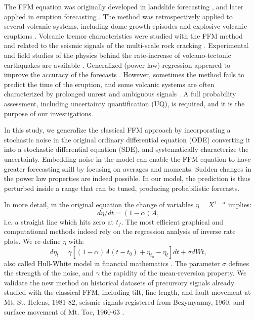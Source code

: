 \documentclass{article}
\begin{document}
The FFM equation was originally developed in landslide forecasting \citep{Voight1987, Voight1988b, Voight1989b}, and later applied in eruption forecasting \citep{Voight1988, Voight1989, Cornelius1995}. The method was retrospectively applied to several volcanic systems, including dome growth episodes and explosive volcanic eruptions \citep{Voight1991, Cornelius1994, Cornelius1996, Voight2000}. Volcanic tremor characteristics were studied with the FFM method and related to the seismic signals of the multi-scale rock cracking \citep{Kilburn1998,Ortiz2003,Kilburn2003}. Experimental and field studies of the physics behind the rate-increase of volcano-tectonic earthquakes are available \citep{Smith2009,Smith2010}. Generalized (power law) regression appeared to improve the accuracy of the forecasts \citep{Bell2011}. However, sometimes the method fails to predict the time of the eruption, and some volcanic systems are often characterized by prolonged unrest and ambiguous signals \citep{Chiodini2016}. A full probability assessment, including uncertainty quantification (UQ), is required, and it is the purpose of our investigations.

In this study, we generalize the classical FFM approach by incorporating a stochastic noise in the original  ordinary differential equation (ODE) converting it into a stochastic differential equation (SDE), and systematically characterize the uncertainty. Embedding noise in the model can enable the FFM equation to have greater forecasting skill by focusing on averages and moments. Sudden changes in the power law properties are indeed possible. In our model, the prediction is thus perturbed inside a range that can be tuned, producing probabilistic forecasts. 

In more detail, in the original equation the change of variables $\eta=X^{1-\alpha}$ implies:
$$d\eta/dt=(1-\alpha)A,$$
i.e. a straight line which hits zero at $t_f$. The most efficient graphical and computational methods indeed rely on the regression analysis of inverse rate plots. We re-define $\eta$ with:
$$d\eta_t=\gamma[(1-\alpha)A(t-t_0)+\eta_{t_0}-\eta_t]dt+\sigma dWt,$$
also called Hull-White model in financial mathematics \citep{HullWhite1990}. The parameter $\sigma$ defines the strength of the noise, and $\gamma$ the rapidity of the mean-reversion property. We validate the new method on historical datasets of precursory signals already studied with the classical FFM, including tilt, line-length, and fault movement at Mt. St. Helens, 1981-82, seismic signals registered from Bezymyanny, 1960, and surface movement of Mt. Toc, 1960-63 \citep{Voight1988}.
\end{document}
